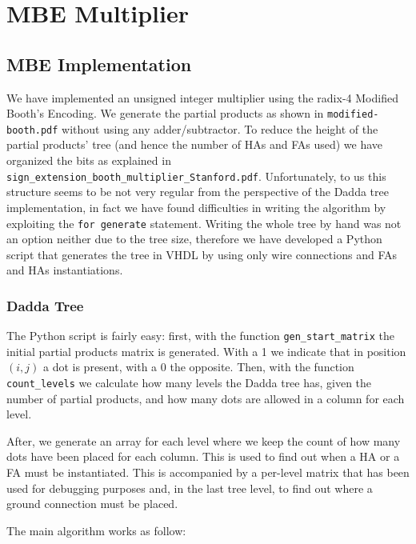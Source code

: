 \chapter{MBE Multiplier}

\section{MBE Implementation}

We have implemented an unsigned integer multiplier using the radix-4 Modified Booth's Encoding.
We generate the partial products as shown in \verb|modified-booth.pdf| without using any adder/subtractor.
To reduce the height of the partial products' tree (and hence the number of HAs and FAs used) we have
organized the bits as explained in \verb|sign_extension_booth_multiplier_Stanford.pdf|.
Unfortunately, to us this structure seems to be not very regular from the perspective of the Dadda tree implementation,
in fact we have found difficulties in writing the algorithm by exploiting the \verb|for generate| statement.
Writing the whole tree by hand was not an option neither due to the tree size, therefore we have developed
a Python script that generates the tree in VHDL by using only wire connections and FAs and HAs instantiations.

\subsection{Dadda Tree}

The Python script is fairly easy: first, with the function \verb|gen_start_matrix| the initial partial products
matrix is generated. With a 1 we indicate that in position $(i, j)$ a dot is present, with a 0 the opposite.
Then, with the function \verb|count_levels| we calculate how many levels the Dadda tree has, given the
number of partial products, and how many dots are allowed in a column for each level.

After, we generate an array for each level where we keep the count of how many dots have been placed for each column.
This is used to find out when a HA or a FA must be instantiated. This is accompanied by a per-level matrix that has
been used for debugging purposes and, in the last tree level, to find out where a ground connection must be placed.

The main algorithm works as follow:

